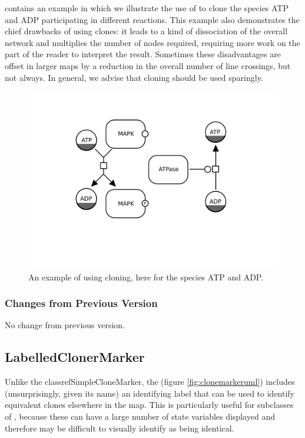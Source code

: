  contains an example in which we illustrate the use of  to clone the species ATP and ADP participating in different reactions.  This example also demonstrates the chief drawbacks of using clones: it leads to a kind of dissociation of the overall network and multiplies the number of nodes required, requiring more work on the part of the reader to interpret the result.  Sometimes these disadvantages are offset in larger maps by a reduction in the overall number of line crossings, but not always.  In general, we advise that cloning should be used sparingly.

\begin{figure}[H]
  \centering
  \includegraphics[scale = 0.5]{examples/cloning}
  \caption{An example of using cloning, here for the species ATP and ADP.}
  \label{fig:example-cloning}
\end{figure}

\subsubsection{Changes from Previous Version}

No change from previous version.


\subsection{LabelledClonerMarker}
\label{defn:LabelledCloneMarker}

Unlike the classref{SimpleCloneMarker}, the
 (figure \ref{fig:clonemarkeruml})
includes (unsurprisingly, given its name) an identifying label that
can be used to identify equivalent clones elsewhere in the map.  This
is particularly useful for subclasses of ,
because these can have a large number of state variables displayed and
therefore may be difficult to visually identify as being identical.

